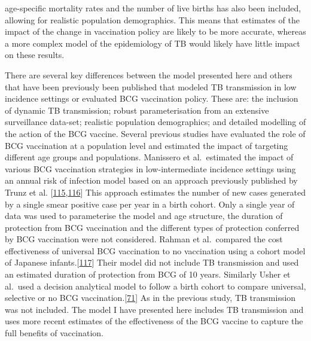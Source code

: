 \documentclass[11pt,twoside]{bristolthesis}
\begin{document}
age-specific mortality rates and the number of live births has also been included, allowing for realistic population demographics. This means that estimates of the impact of the change in vaccination policy are likely to be more accurate, whereas a more complex model of the epidemiology of TB would likely have little impact on these results.
  
  There are several key differences between the model presented here and others that have been previously been published that modeled TB transmission in low incidence settings or evaluated BCG vaccination policy. These are: the inclusion of dynamic TB transmission; robust parameterisation from an extensive surveillance data-set; realistic population demographics; and detailed modelling of the action of the BCG vaccine. Several previous studies have evaluated the role of BCG vaccination at a population level and estimated the impact of targeting different age groups and populations. Manissero et al.~estimated the impact of various BCG vaccination strategies in low-intermediate incidence settings using an annual risk of infection model based on an approach previously published by Trunz et al. {[}\protect\hyperlink{ref-Manissero2008a}{115},\protect\hyperlink{ref-Trunz2006}{116}{]} This approach estimates the number of new cases generated by a single smear positive case per year in a birth cohort. Only a single year of data was used to parameterise the model and age structure, the duration of protection from BCG vaccination and the different types of protection conferred by BCG vaccination were not considered. Rahman et al.~compared the cost effectiveness of universal BCG vaccination to no vaccination using a cohort model of Japanese infants.{[}\protect\hyperlink{ref-Rahman2001a}{117}{]} Their model did not include TB transmission and used an estimated duration of protection from BCG of 10 years. Similarly Usher et al.~used a decision analytical model to follow a birth cohort to compare universal, selective or no BCG vaccination.{[}\protect\hyperlink{ref-Usher2016}{71}{]} As in the previous study, TB transmission was not included. The model I have presented here includes TB transmission and uses more recent estimates of the effectiveness of the BCG vaccine to capture the full benefits of vaccination.
  
\end{document}
